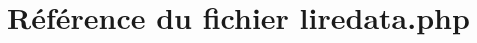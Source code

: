 \hypertarget{liredata_8php}{
\section{R\'{e}f\'{e}rence du fichier liredata.php}
\label{liredata_8php}
}
